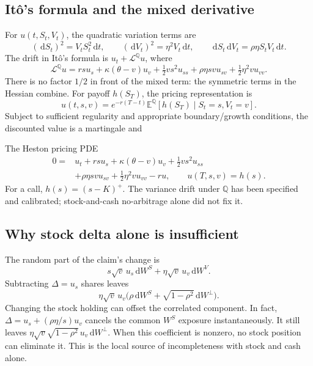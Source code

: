 \documentclass[10pt]{article}
\newcommand{\E}{\mathbb E}\newcommand{\Q}{\mathbb Q}\newcommand{\cF}{\mathcal F}
\newcommand{\dd}{\,\mathrm d}\newcommand{\Pp}{\mathbb P}\newcommand{\Var}{\operatorname{Var}}\newcommand{\Cov}{\operatorname{Cov}}
\theoremstyle{definition}\newtheorem{definition}{Definition}[section]
\begin{document}
\subsection{It\^o's formula and the mixed derivative}
For \(u(t,S_t,V_t)\), the quadratic variation terms are
\[
(\dd S_t)^2=V_tS_t^2\dd t,\qquad
(\dd V_t)^2=\eta^2V_t\dd t,\qquad
\dd S_t\dd V_t=\rho\eta S_tV_t\dd t.
\]
The drift in It\^o's formula is \(u_t+\mathcal L^\Q u\), where
\[
\mathcal L^\Q u=rsu_s+\kappa(\theta-v)u_v
+\tfrac12vs^2u_{ss}+\rho\eta svu_{sv}+\tfrac12\eta^2vu_{vv}.
\]
There is no factor \(1/2\) in front of the mixed term: the symmetric
terms in the Hessian combine. For payoff \(h(S_T)\), the pricing
representation is
\[
u(t,s,v)=e^{-r(T-t)}\E^\Q[h(S_T)\mid S_t=s,V_t=v].
\]
Subject to sufficient regularity and appropriate boundary/growth
conditions, the discounted value is a martingale and
\begin{keyidea}{The Heston pricing PDE}
\[
\boxed{\begin{aligned}
0={}&u_t+rsu_s+\kappa(\theta-v)u_v+\tfrac12vs^2u_{ss}\\
&+\rho\eta svu_{sv}+\tfrac12\eta^2vu_{vv}-ru,
\qquad u(T,s,v)=h(s).
\end{aligned}}
\]
For a call, \(h(s)=(s-K)^+\). The variance drift under \(\Q\) has been
specified and calibrated; stock-and-cash no-arbitrage alone did not fix it.
\end{keyidea}

\subsection{Why stock delta alone is insufficient}
The random part of the claim's change is
\[
s\sqrt v\,u_s\dd W^S+\eta\sqrt v\,u_v\dd W^V.
\]
Subtracting \(\Delta=u_s\) shares leaves
\[
\eta\sqrt v\,u_v\bigl(\rho\dd W^S+\sqrt{1-\rho^2}\dd W^\perp\bigr).
\]
Changing the stock holding can offset the correlated component. In fact,
\(\Delta=u_s+(\rho\eta/s)u_v\) cancels the common \(W^S\) exposure
instantaneously. It still leaves
\(\eta\sqrt v\sqrt{1-\rho^2}\,u_v\dd W^\perp\). When this coefficient
is nonzero, no stock position can eliminate it. This is the local source
of incompleteness with stock and cash alone.
\end{document}
